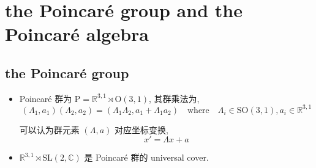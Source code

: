 \chapter{the Poincaré group and the Poincaré algebra}
\section{the Poincaré group}
\begin{itemize}
	\item Poincaré 群为 $\mathrm{P} = \mathbb{R}^{3, 1} \rtimes \mathrm{O}(3, 1)$, 其群乘法为,
	\begin{equation}
		(\Lambda_1, a_1) (\Lambda_2, a_2) = (\Lambda_1 \Lambda_2, a_1 + \Lambda_1 a_2) \quad \text{where} \quad \Lambda_i \in \mathrm{SO}(3, 1), a_i \in \mathbb{R}^{3, 1}
	\end{equation}
	
	\begin{tcolorbox}[title=comment:]
		可以认为群元素 $(\Lambda, a)$ 对应坐标变换,
		\begin{equation}
			x' = \Lambda x + a
		\end{equation}
	\end{tcolorbox}
	
	\item $\mathbb{R}^{3, 1} \rtimes \mathrm{SL}(2, \mathbb{C})$ 是 Poincaré 群的 universal cover.
\end{itemize}

